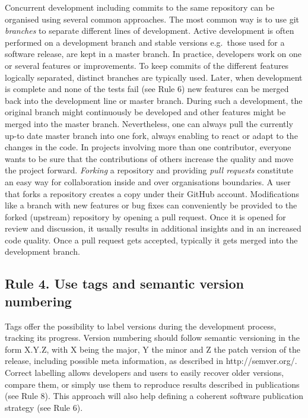 \documentclass[10pt,letterpaper]{article}
\begin{document}
Concurrent development including commits to the same repository can be
organised using several common approaches. The most common way is to use
git \emph{branches} to separate different lines of development. Active
development is often performed on a development branch and stable
versions e.g.~those used for a software release, are kept in a master
branch. In practice, developers work on one or several features or
improvements. To keep commits of the different features logically
separated, distinct branches are typically used. Later, when development
is complete and none of the tests fail (see Rule 6) new features can be
merged back into the development line or master branch. During such a
development, the original branch might continuously be developed and
other features might be merged into the master branch. Nevertheless, one
can always pull the currently up-to date master branch into one fork,
always enabling to react or adapt to the changes in the code. In
projects involving more than one contributor, everyone wants to be sure
that the contributions of others increase the quality and move the
project forward. \emph{Forking} a repository and providing \emph{pull
requests} constitute an easy way for collaboration inside and over
organisations boundaries. A user that forks a repository creates a copy
under their GitHub account. Modifications like a branch with new
features or bug fixes can conveniently be provided to the forked
(upstream) repository by opening a pull request. Once it is opened for
review and discussion, it usually results in additional insights and in
an increased code quality. Once a pull request gets accepted, typically
it gets merged into the development branch.

\subsection*{Rule 4. Use tags and semantic version
numbering}\label{rule-4.-use-tags-and-semantic-version-numbering}

Tags offer the possibility to label versions during the development
process, tracking its progress. Version numbering should follow semantic
versioning in the form X.Y.Z, with X being the major, Y the minor and Z
the patch version of the release, including possible meta information,
as described in http://semver.org/. Correct labelling allows developers
and users to easily recover older versions, compare them, or simply use
them to reproduce results described in publications (see Rule 8). This
approach will also help defining a coherent software publication
strategy (see Rule 6).
\end{document}

